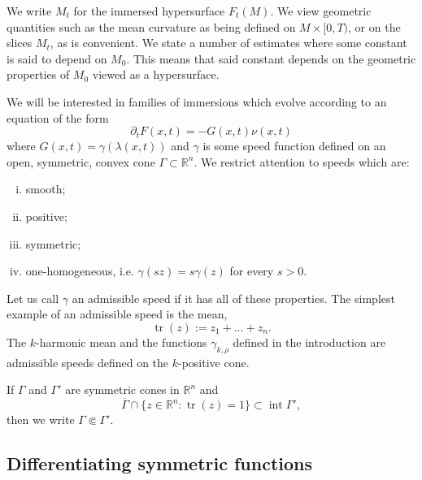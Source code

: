 \documentclass[12pt]{amsart}
\DeclareMathOperator{\interior}{int}
\DeclareMathOperator{\tr}{tr}
\begin{document}
We write $M_t$ for the immersed hypersurface $F_t(M)$. We view geometric quantities such as the mean curvature as being defined on $M\times[0,T)$, or on the slices $M_t$, as is convenient. We state a number of estimates where some constant is said to depend on $M_0$. This means that said constant depends on the geometric properties of $M_0$ viewed as a hypersurface. 

We will be interested in families of immersions which evolve according to an equation of the form 
\begin{equation}
\partial_t F(x,t) = - G(x,t) \nu(x,t) \label{eq:CF_general}
\end{equation}
where $G(x,t) = \gamma(\lambda(x,t))$ and $\gamma$ is some speed function defined on an open, symmetric, convex cone $\Gamma \subset  \mathbb{R}^n$. We restrict attention to speeds which are:
\begin{enumerate}[(i)]
\item smooth;
\item positive; \label{pos}
\item symmetric;
\item one-homogeneous, i.e.  $\gamma(s z) = s \gamma(z)$ for every $s > 0$.
\end{enumerate}
Let us call $\gamma$ an admissible speed if it has all of these properties. The simplest example of an admissible speed is the mean, 
\[\tr(z) := z_1 + \dots + z_n.\]
The $k$-harmonic mean and the functions $\gamma_{k,\rho}$ defined in the introduction are admissible speeds defined on the $k$-positive cone.

If $\Gamma$ and $\Gamma'$ are symmetric cones in $\mathbb{R}^n$ and
\[ \overline {\Gamma} \cap \{z \in \mathbb{R}^n : \tr(z) = 1\} \subset \interior \Gamma',\]
then we write $\Gamma \Subset \Gamma'$.

\subsection{Differentiating symmetric functions}
\end{document}
